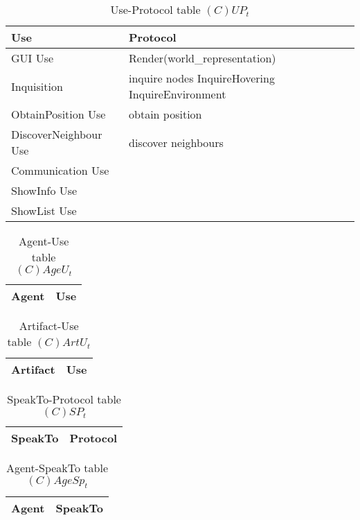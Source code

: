 \begin{table}[H]
	\centering
	\begin{tabular}{|p{4cm}|p{8cm}|}
			\hline
			\textbf{Use} & \textbf{Protocol} \\
			\hline
			GUI Use & Render(world\_representation)\\
			\hline
			Inquisition & inquire nodes \newline InquireHovering \newline
			InquireEnvironment\\
			\hline
			ObtainPosition Use & obtain position\\
			\hline
			DiscoverNeighbour Use & discover neighbours\\
			\hline
			Communication Use & \\
			\hline
			ShowInfo Use & \\
			\hline
			ShowList Use & \\
			\hline
		\end{tabular}
	\caption{Use-Protocol table $(C)UP_t$}
	\label{tab:cupt}
\end{table}

\begin{table}[H]
	\centering
	\begin{tabular}{|p{4cm}|p{8cm}|}
			\hline
			\textbf{Agent} & \textbf{Use} \\
			\hline
			\hline
		\end{tabular}
	\caption{Agent-Use table $(C)AgeU_t$}
	\label{tab:cageut}
\end{table}

\begin{table}[H]
	\centering
	\begin{tabular}{|p{4cm}|p{8cm}|}
			\hline
			\textbf{Artifact} & \textbf{Use} \\
			\hline
			\hline
		\end{tabular}
	\caption{Artifact-Use table $(C)ArtU_t$}
	\label{tab:cartut}
\end{table}

\begin{table}[H]
	\centering
	\begin{tabular}{|p{4cm}|p{8cm}|}
			\hline
			\textbf{SpeakTo} & \textbf{Protocol} \\
			\hline
			\hline
		\end{tabular}
	\caption{SpeakTo-Protocol table $(C)SP_t$}
	\label{tab:cspt}
\end{table}

\begin{table}[H]
	\centering
	\begin{tabular}{|p{4cm}|p{8cm}|}
			\hline
			\textbf{Agent} & \textbf{SpeakTo} \\
			\hline
			\hline
		\end{tabular}
	\caption{Agent-SpeakTo table $(C)AgeSp_t$}
	\label{tab:cagespt}
\end{table}

